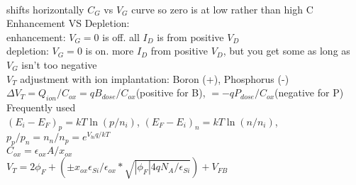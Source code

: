 \documentclass{article}
\begin{document}
\begin{large}
\\shifts horizontally $C_G$ vs $V_G$ curve so zero is at low rather than high C
\\Enhancement VS Depletion:
\\enhancement: $V_G=0$ is off. all $I_D$ is from positive $V_D$
\\depletion: $V_G=0$ is on. more $I_D$ from positive $V_D$, but you get some as long as $V_G$ isn't too negative
\\$V_T$ adjustment with ion implantation: Boron (+), Phosphorus (-)
\\$\Delta V_T=Q_{ion}/C_{ox}=qB_{dose}/C_{ox}$(positive for B), $=-qP_{dose}/C_{ox}$(negative for P)
\\Frequently used
\\$(E_i-E_F)_p=kT\ln(p/n_i)$, $(E_F-E_i)_n=kT\ln(n/n_i)$, $p_p/p_n=n_n/n_p=e^{V_{bi} q/kT}$
\\$C_{ox}=\epsilon_{ox} A / x_{ox}$
\\$V_T=2\phi_F+(\pm x_{ox}\epsilon_{Si}/\epsilon_{ox} * \sqrt{|\phi_F|4qN_A/\epsilon_{Si}})+V_{FB}$
\end{large}
\end{document}
